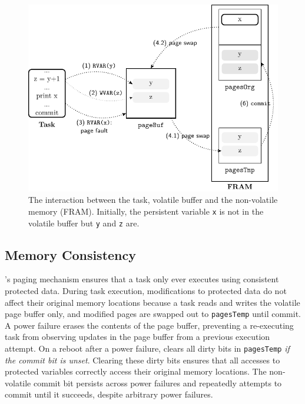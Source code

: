 \begin{figure}[t]
	\centering
	\includegraphics[width=0.75\columnwidth]{figures/sram-buffer}
	\caption{The interaction between the task, volatile buffer and the non-volatile memory (FRAM). Initially, the persistent variable \texttt{x} is not in the volatile buffer but \texttt{y} and \texttt{z} are.}
	\label{fig:volatile-buffer}
\end{figure}

\subsection{Memory Consistency}

\sys's paging mechanism ensures that a task only ever executes using consistent protected data. During task execution, modifications to protected data do not affect their original memory locations because a task reads and writes the volatile page buffer only, and modified pages are swapped out to \texttt{pagesTemp} until commit. A power failure erases the contents of the page buffer, preventing a re-executing task from observing updates in the page buffer from a previous execution attempt. On a reboot after a power failure,
\sys clears all dirty bits in {\tt pagesTemp} {\em if the commit bit is unset}. Clearing these dirty bits ensures that all accesses to protected variables correctly access their original memory locations. The non-volatile commit bit persists across power failures and \sys repeatedly attempts to commit until it succeeds, despite arbitrary power failures.

